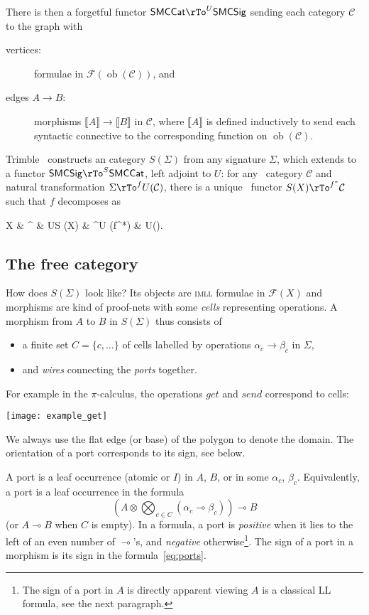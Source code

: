 \documentclass{llncs}
\DeclareMathOperator{\ob}{ob}
\newcommand{\bigcat}[1]{\mathsf{#1}}
\newcommand{\Formulae}{\mathcal{F}}
\newcommand{\C}{\mathcal{C}}
\newcommand{\Sig}{\bigcat{SMCSig}} \newcommand{\Set}{\bigcat{Set}}
\newcommand{\SMCCat}{\bigcat{SMCCat}}
\newcommand{\imll}{\textsc{imll}}
\newcommand{\transl}[1]{\llbracket #1 \rrbracket}
\newcommand{\impll}{\multimap}
\newcommand{\tens}{\otimes}
\newcommand{\bigtens}{\bigotimes}
\newcommand{\Bigtens}[1]{\displaystyle{\bigtens_{#1}}}
\newcommand{\ens}[1]{\{ #1 \}}
\begin{document}
There is then a forgetful functor $\SMCCat \rTo^{U} \Sig$ sending
each \smc{} category $\C$ to the graph with
\begin{description}
\item[vertices:] formulae in $\Formulae (\ob (\C))$, and
\item[edges $A \to B$:] morphisms $\transl{A} \to \transl{B}$ in $\C$,
  where $\transl{A}$ is defined inductively to send each syntactic
  connective to the corresponding function on $\ob (\C)$.
\end{description}

Trimble~\cite{Trimble:phd} constructs an \smc{} category $S (\Sigma)$
from any signature $\Sigma$, which extends to a functor $\Sig \rTo^{S}
\SMCCat$, left adjoint to $U$: for any \smc\ category $\C$ and natural
transformation $\Sigma \rTo^{f} U (\C)$, there is a unique \smc\
functor $S (X) \rTo^{f^*} \C$ such that $f$ decomposes as
\begin{diagram}[inline]
  X & \rTo^{\eta} & US (X) & \rTo^{U (f^*)} & U(\C).
\end{diagram}

\subsection{The free \smc{} category}
How does $S (\Sigma)$ look like?  Its objects are \imll{} formulae in
$\Formulae (X)$ and morphisms are kind of proof-nets with some
\emph{cells} representing operations.  A morphism from $A$ to $B$ in
$S (\Sigma)$ thus consists of
\begin{itemize}
\item a finite set $C = \ens{c, \ldots}$ of cells labelled by
  operations $\alpha_c \to \beta_c$ in $\Sigma$,
    \item and \emph{wires} connecting the \emph{ports} together.
\end{itemize}
For example in the $\pi$-calculus, the operations $\mathit{get}$ and
$\mathit{send}$ correspond to cells:
\begin{center}
\texttt{[image: example\_get]}
\end{center}
We always use the flat edge (or base) of the polygon to denote the domain. 
The orientation of a port corresponds to its sign, see below. 

A port is a leaf occurrence (atomic or $I$) in $A$, $B$, or in some
$\alpha_c$, $\beta_c$.
Equivalently, a port is a leaf occurrence in the formula
\begin{equation}
  (A \tens \Bigtens{c \in C} (\alpha_c \impll \beta_c)) \impll B\label{eq:ports}
\end{equation}
(or $A \impll B$ when $C$ is empty).
In a formula, a port is \emph{positive} when it lies to the left of an even
number of $\impll$'s, and \emph{negative} otherwise\footnote{The sign of a port
in $A$ is directly apparent viewing $A$ is a classical LL formula, see the next
paragraph.}.
The sign of a port in a morphism is its sign in the formula~\eqref{eq:ports}.
\end{document}
